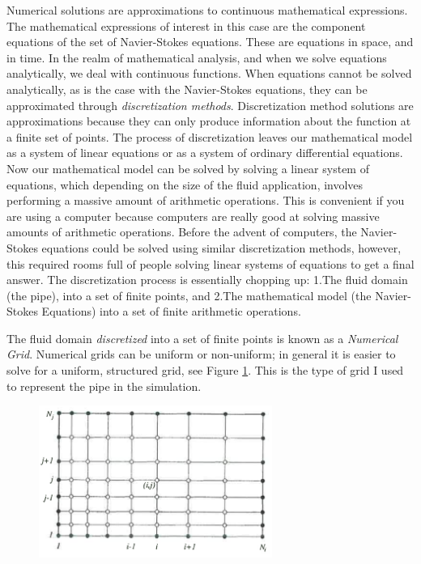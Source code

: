 \documentclass[twocolumn,12pth]{article}
\begin{document}
Numerical solutions are approximations to continuous mathematical expressions.
The mathematical expressions of interest in this case are the component equations of the set of Navier-Stokes equations.
These are equations in space, and in time. 
In the realm of mathematical analysis, and when we solve equations analytically, we deal with continuous functions.
When equations cannot be solved analytically, as is the case with the Navier-Stokes equations, they can be approximated through \textit{discretization methods}.
Discretization method solutions are approximations because they can only produce information about the function at a finite set of points.
The process of discretization leaves our mathematical model as a system of linear equations or as a system of ordinary differential equations.
Now our mathematical model can be solved by solving a linear system of equations, which depending on the size of the fluid application, involves performing a massive amount of arithmetic operations.
This is convenient if you are using a computer because computers are really good at solving massive amounts of arithmetic operations.
Before the advent of computers, the Navier-Stokes equations could be solved using similar discretization methods, however, this required rooms full of people solving linear systems of equations to get a final answer.
The discretization process is essentially chopping up: 1.The fluid domain (the pipe), into a set of finite points, and 2.The mathematical model (the Navier-Stokes Equations) into a set of finite arithmetic operations.

The fluid domain \textit{discretized} into a set of finite points is known as a \textit{Numerical Grid}.
Numerical grids can be uniform or non-uniform; in general it is easier to solve for a uniform, structured grid, see Figure \ref{fig:grid}.
This is the type of grid I used to represent the pipe in the simulation.

\begin{figure}
\centering
\includegraphics[width=3.0in]{numericalGrid.png}
\label{fig:grid}
\end{figure}
\end{document}
